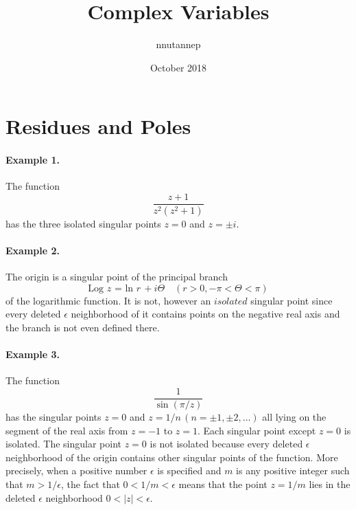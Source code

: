 \documentclass{article}
\title{Complex Variables}
\author{nnutannep}
\date{October 2018}
\begin{document}
    
    \maketitle
    
    \section{Residues and Poles}

    \paragraph{Example 1.}The function$$\frac{z + 1}{z^2(z^2+1)}$$
     has the three isolated singular points $z=0$ and $z=\pm i.$

    \paragraph{Example 2.} The origin is a singular point of the principal branch
    $$\text{Log $z$ = ln $r$}\, + i\Theta \quad (r > 0, -\pi < \Theta < \pi)$$
    of the logarithmic function. It is not, however an $isolated$ singular point
    since every deleted $\epsilon $ neighborhood of it contains points on the negative
    real axis and the branch is not even defined there.

    \paragraph{Example 3.}The function $$\displaystyle \frac{1}{\sin{(\pi/z)}}$$ has the 
    singular points $z=0$ and $z=1/n\, (n=\pm1,\pm2,...)$ all lying on the segment of the 
    real axis from $z=-1$ to $z=1$. Each singular point except $z=0$ is isolated. The 
    singular point $z=0$ is not isolated because every deleted $\epsilon$neighborhood 
    of the origin contains other singular points of the function. More precisely, when 
    a positive number $\epsilon$ is specified and $m$ is any positive integer such that 
    $m>1/\epsilon$, the fact that $0<1/m<\epsilon$ means that the point $z=1/m$ lies in 
    the deleted $\epsilon$ neighborhood $0<|z| < \epsilon$.
    
    
\end{document}
